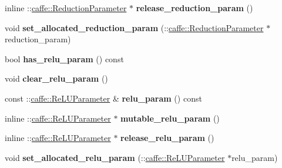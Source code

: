 \begin{DoxyCompactItemize}
\item 
\mbox{\label{classcaffe_1_1_layer_parameter_ad60dd4cd3bf2108a198913dc4f3fd18f}} 
inline \+::\mbox{\hyperlink{classcaffe_1_1_reduction_parameter}{caffe\+::\+Reduction\+Parameter}} $\ast$ {\bfseries release\+\_\+reduction\+\_\+param} ()
\item 
\mbox{\label{classcaffe_1_1_layer_parameter_ac718575636cdb113f35785b8c09f73bb}} 
void {\bfseries set\+\_\+allocated\+\_\+reduction\+\_\+param} (\+::\mbox{\hyperlink{classcaffe_1_1_reduction_parameter}{caffe\+::\+Reduction\+Parameter}} $\ast$reduction\+\_\+param)
\item 
\mbox{\label{classcaffe_1_1_layer_parameter_a57e1d92f6b9aa017b08768b3c886952c}} 
bool {\bfseries has\+\_\+relu\+\_\+param} () const
\item 
\mbox{\label{classcaffe_1_1_layer_parameter_a61541c1d18f3eb07233b9d11768761ed}} 
void {\bfseries clear\+\_\+relu\+\_\+param} ()
\item 
\mbox{\label{classcaffe_1_1_layer_parameter_afdaaebe3786c2ba30beb37f3cedd8e52}} 
const \+::\mbox{\hyperlink{classcaffe_1_1_re_l_u_parameter}{caffe\+::\+Re\+L\+U\+Parameter}} \& {\bfseries relu\+\_\+param} () const
\item 
\mbox{\label{classcaffe_1_1_layer_parameter_a73326cd491dc26c190f55d3a42519571}} 
inline \+::\mbox{\hyperlink{classcaffe_1_1_re_l_u_parameter}{caffe\+::\+Re\+L\+U\+Parameter}} $\ast$ {\bfseries mutable\+\_\+relu\+\_\+param} ()
\item 
\mbox{\label{classcaffe_1_1_layer_parameter_a89cd0f7183f244dd0370a5c198f35788}} 
inline \+::\mbox{\hyperlink{classcaffe_1_1_re_l_u_parameter}{caffe\+::\+Re\+L\+U\+Parameter}} $\ast$ {\bfseries release\+\_\+relu\+\_\+param} ()
\item 
\mbox{\label{classcaffe_1_1_layer_parameter_a9c3361f356d4b679778c023af2eb1c85}} 
void {\bfseries set\+\_\+allocated\+\_\+relu\+\_\+param} (\+::\mbox{\hyperlink{classcaffe_1_1_re_l_u_parameter}{caffe\+::\+Re\+L\+U\+Parameter}} $\ast$relu\+\_\+param)

\end{DoxyCompactItemize}

